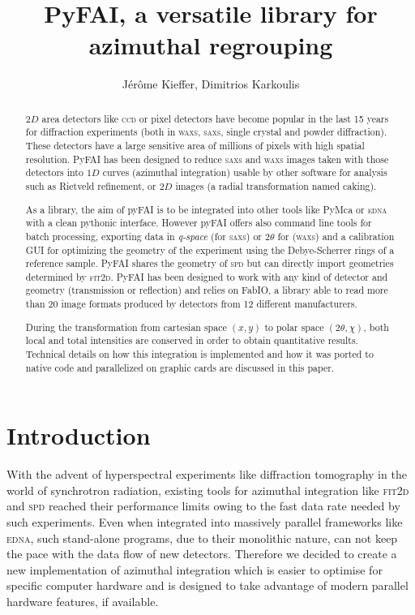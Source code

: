 \documentclass[a4paper]{jpconf}
\begin{document}
\title{PyFAI, a versatile library for azimuthal regrouping}

\author{J\'er\^ome Kieffer, Dimitrios Karkoulis}

\address{European Synchrotron Radiation Facility; 6 rue Jules Horowitz;
38043 Grenoble; France}


\begin{abstract}
$2D$ area detectors like \textsc{ccd} or pixel detectors have become popular
in the last 15 years for diffraction experiments (both in \textsc{waxs},
\textsc{saxs}, single crystal and powder diffraction).
These detectors have a large sensitive area of millions of pixels with  high
spatial resolution. PyFAI has been designed to reduce
\textsc{saxs} and \textsc{waxs} images taken with those detectors into $1D$ curves (azimuthal
integration) usable by other software for analysis such as Rietveld refinement,
or $2D$ images (a radial transformation named caking).

As a library, the aim of pyFAI is to be integrated into other tools like
PyMca\cite{pymca} or \textsc{edna}\cite{edna} with a clean pythonic interface.
However pyFAI offers also command line tools for batch processing, exporting
data in {\em q-space} (for \textsc{saxs}) or 2$\theta$ for (\textsc{waxs}) and a
calibration GUI for optimizing the geometry of the experiment using the
Debye-Scherrer rings of a reference sample.  PyFAI
shares the geometry of \textsc{spd}\cite{spd} but can directly import geometries determined by \textsc{fit2d}\cite{fit2d1996}.
PyFAI has been designed to work with any kind of detector and geometry (transmission or reflection) and
relies on FabIO\cite{fabio}, a library able to read more than 20 image
formats produced by detectors from 12 different manufacturers.

During the transformation from cartesian space $(x,y)$ to polar
space $(2\theta, \chi )$, both local and total intensities are conserved
in order to obtain quantitative results. Technical details on how this
integration is implemented and how it was ported to native code and
parallelized on graphic cards are discussed in this paper.
\end{abstract}

\section{Introduction}

With the advent of hyperspectral experiments like diffraction tomography in the
world of synchrotron radiation, existing tools for azimuthal integration like
\textsc{fit2d}\cite{fit2d1996} and \textsc{spd}\cite{spd} reached their
performance limits owing to the fast data rate needed by such experiments. Even
when integrated into massively parallel frameworks like
\textsc{edna}\cite{edna}, such stand-alone programs, due to their monolithic
nature, can not keep the pace with the data flow of new detectors.
Therefore we decided to create a new implementation of azimuthal integration
which is easier to optimise for specific computer hardware and is designed to
take advantage of modern parallel hardware features, if available.
\end{document}
